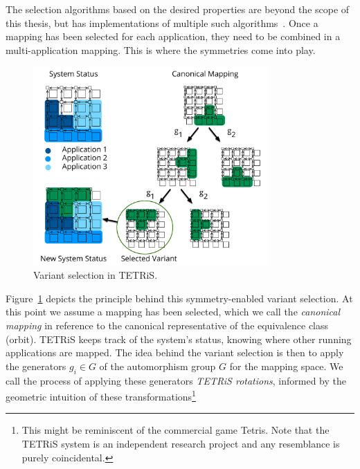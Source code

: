 The selection algorithms based on the desired properties are beyond the scope of this thesis, but \mocasin has implementations of multiple such algorithms~\cite{khasanov_date20}.
Once a mapping has been selected for each application, they need to be combined in a multi-application mapping.
This is where the symmetries come into play. 

\begin{figure}[th]
	\centering
	\includegraphics[width=0.8\textwidth]{figures/Variant_Selection.pdf}
	\caption{Variant selection in \ac{TETRiS}.}
	\label{fig:tetris_variant_selection}
\end{figure}

Figure~\ref{fig:tetris_variant_selection} depicts the principle behind this symmetry-enabled variant selection.
At this point we assume a mapping has been selected, which we call the \emph{canonical mapping} in reference to the canonical representative of the equivalence class (orbit).
\ac{TETRiS} keeps track of the system's status, knowing where other running applications are mapped.
The idea behind the variant selection is then to apply the generators $g_i \in G$ of the automorphism group $G$ for the mapping space. 
We call the process of applying these generators \emph{\ac{TETRiS} rotations}, informed by the geometric intuition of these transformations\footnote{This might be reminiscent of the commercial game Tetris. Note that the \ac{TETRiS} system is an independent research project and any resemblance is purely coincidental.}

